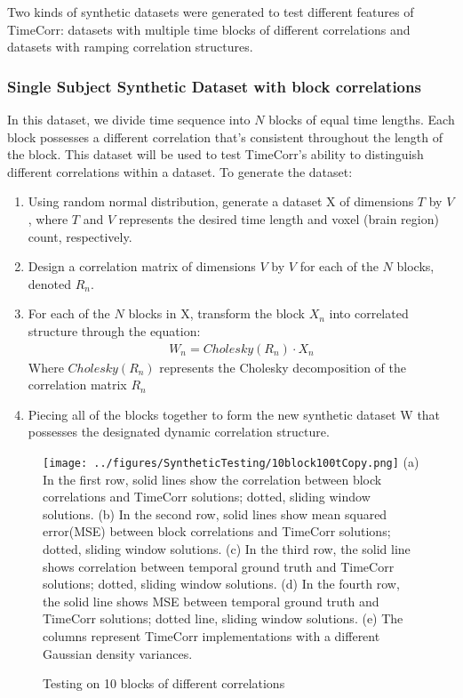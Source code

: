 \documentclass[11pt]{article}
\begin{document}
Two kinds of synthetic datasets were generated to test different features of TimeCorr: datasets with multiple time blocks of different correlations and datasets with ramping correlation structures.

\subsubsection{Single Subject Synthetic Dataset with block correlations}

In this dataset, we divide time sequence into $N$ blocks of equal time lengths. Each block possesses a different correlation that's consistent throughout the length of the block. This dataset will be used to test TimeCorr's ability to distinguish different correlations within a dataset. To generate the dataset:
\begin{enumerate}
\item Using random normal distribution, generate a dataset X of dimensions $T$ by $V$, where $T$ and $V$ represents the desired time length and voxel (brain region) count, respectively.
\item Design a correlation matrix of dimensions $V$ by $V$ for each of the $N$ blocks, denoted $R_n$.
\item For each of the $N$ blocks in X, transform the block $X_n$ into correlated structure through the equation:
\begin{align*}
W_n = Cholesky(R_n) \cdot X_n
\end{align*}
Where $Cholesky(R_n)$ represents the Cholesky decomposition of the correlation matrix $R_n$
\item Piecing all of the blocks together to form the new synthetic dataset W that possesses the designated dynamic correlation structure.
\end{enumerate}

\begin{figure}[!htb]
\caption{Testing on 10 blocks of different correlations}
\texttt{[image: ../figures/SyntheticTesting/10block100tCopy.png]}
\label{fig:10block100t}
(a) In the first row, solid lines show the correlation between block correlations and TimeCorr solutions; dotted, sliding window solutions. (b) In the second row, solid lines show mean squared error(MSE) between block correlations and TimeCorr solutions; dotted, sliding window solutions. (c) In the third row, the solid line shows correlation between temporal ground truth and TimeCorr solutions; dotted, sliding window solutions. (d) In the fourth row, the solid line shows MSE between temporal ground truth and TimeCorr solutions; dotted line, sliding window solutions. (e) The columns represent TimeCorr implementations with a different Gaussian density variances.
\end{figure}
\end{document}
